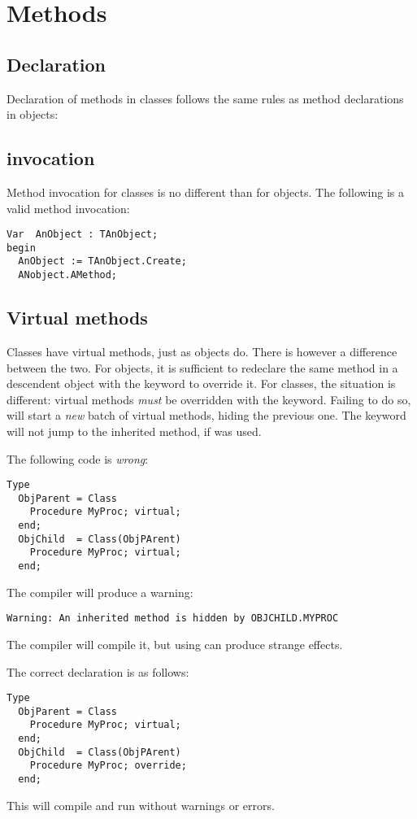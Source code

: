 \section{Methods}
\subsection{Declaration}
Declaration of methods in classes follows the same rules as method
declarations in objects:


\subsection{invocation}
Method invocation for classes is no different than for objects. The
following is a valid method invocation:
\begin{verbatim}
Var  AnObject : TAnObject;
begin
  AnObject := TAnObject.Create;
  ANobject.AMethod;
\end{verbatim}


\subsection{Virtual methods}
Classes have virtual methods, just as objects do. There is however a
difference between the two. For objects, it is sufficient to redeclare the
same method in a descendent object with the keyword  to
override it. For classes, the situation is different: virtual methods 
{\em must} be overridden with the  keyword. Failing to do so,
will start a {\em new} batch of virtual methods, hiding the previous
one.  The  keyword will not jump to the inherited method, if
 was used.

The following code is {\em wrong}:
\begin{verbatim}
Type 
  ObjParent = Class
    Procedure MyProc; virtual;
  end;
  ObjChild  = Class(ObjPArent)
    Procedure MyProc; virtual;
  end;
\end{verbatim}
The compiler will produce a warning:
\begin{verbatim}
Warning: An inherited method is hidden by OBJCHILD.MYPROC
\end{verbatim}
The compiler will compile it, but using  can
produce strange effects.

The correct declaration is as follows:
\begin{verbatim}
Type 
  ObjParent = Class
    Procedure MyProc; virtual;
  end;
  ObjChild  = Class(ObjPArent)
    Procedure MyProc; override;
  end;
\end{verbatim}
This will compile and run without warnings or errors.

